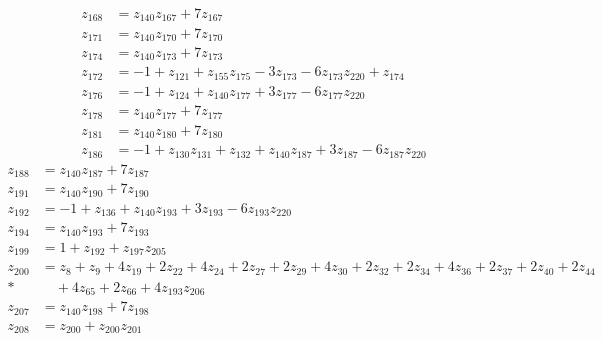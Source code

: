 \begin{align*}
z_{168}&=z_{140} z_{167}+7z_{167}\\[3pt]
z_{171}&=z_{140} z_{170}+7z_{170}\\[3pt]
z_{174}&=z_{140} z_{173}+7z_{173}\\[3pt]
z_{172}&=-1+z_{121}+z_{155} z_{175}-3z_{173}-6z_{173} z_{220}+z_{174}\\[3pt]
z_{176}&=-1+z_{124}+z_{140} z_{177}+3z_{177}-6z_{177} z_{220}\\[3pt]
z_{178}&=z_{140} z_{177}+7z_{177}\\[3pt]
z_{181}&=z_{140} z_{180}+7z_{180}\\[3pt]
z_{186}&=-1+z_{130} z_{131}+z_{132}+z_{140} z_{187}+3z_{187}-6z_{187} z_{220}
\end{align*}
\begin{align*}
z_{188}&=z_{140} z_{187}+7z_{187}\\[3pt]
z_{191}&=z_{140} z_{190}+7z_{190}\\[3pt]
z_{192}&=-1+z_{136}+z_{140} z_{193}+3z_{193}-6z_{193} z_{220}\\[3pt]
z_{194}&=z_{140} z_{193}+7z_{193}\\[3pt]
z_{199}&=1+z_{192}+z_{197} z_{205}\\[3pt]
z_{200}&=z_{8}+z_{9}+4z_{19}+2z_{22}+4z_{24}+2z_{27}+2z_{29}+4z_{30}+2z_{32}+2z_{34}+4z_{36}+2z_{37}+2z_{40}+2z_{44}\\*
&\quad{}+4z_{65}+2z_{66}+4z_{193} z_{206}\\[3pt]
z_{207}&=z_{140} z_{198}+7z_{198}\\[3pt]
z_{208}&=z_{200}+z_{200} z_{201}
\end{align*}
